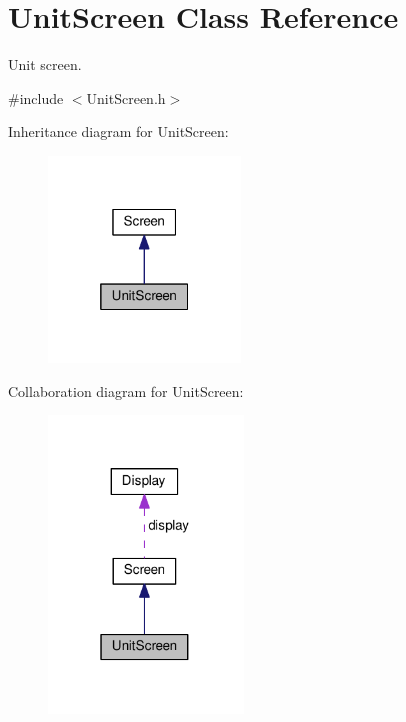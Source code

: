 \hypertarget{classUnitScreen}{}\section{Unit\+Screen Class Reference}
\label{classUnitScreen}


Unit screen.  




{\ttfamily \#include $<$Unit\+Screen.\+h$>$}



Inheritance diagram for Unit\+Screen\+:\nopagebreak
\begin{figure}[H]
\begin{center}
\leavevmode
\includegraphics[width=145pt]{classUnitScreen__inherit__graph}
\end{center}
\end{figure}


Collaboration diagram for Unit\+Screen\+:\nopagebreak
\begin{figure}[H]
\begin{center}
\leavevmode
\includegraphics[width=147pt]{classUnitScreen__coll__graph}
\end{center}
\end{figure}
